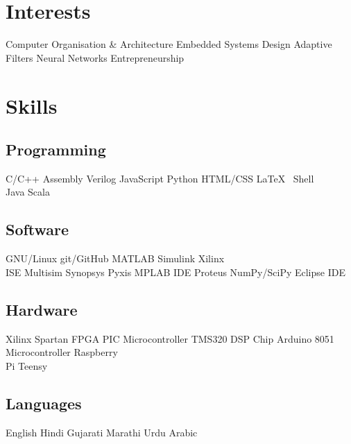 \documentclass[]{deedy}
\begin{document}
\begin{minipage}[t]{0.25\textwidth} 
\begin{flushleft}
%
\section{Interests}
Computer Organisation \& Architecture \textbullet{} Embedded Systems Design \textbullet{} Adaptive Filters \textbullet{} Neural Networks \textbullet{} Entrepreneurship
\sectionsep
%
\section{Skills}
\subsection{Programming}
C/C++ \textbullet{} Assembly \textbullet{} Verilog \textbullet{} JavaScript \textbullet{} Python \textbullet{} HTML/CSS \textbullet{} \LaTeX\ \textbullet{} Shell \textbullet{} \\
Java \textbullet{} Scala
%
\subsection{Software}
GNU/Linux \textbullet{} git/GitHub \textbullet{} MATLAB \textbullet{} Simulink \textbullet{} Xilinx \\
ISE \textbullet{} Multisim \textbullet{} Synopsys \textbullet{} Pyxis \textbullet{} MPLAB IDE \textbullet{} Proteus \textbullet{} NumPy/SciPy \textbullet{} Eclipse IDE
%
\subsection{Hardware}
Xilinx Spartan FPGA \textbullet{} PIC Microcontroller \textbullet{} TMS320 DSP Chip \textbullet{} Arduino \textbullet{} 8051 Microcontroller \textbullet{} Raspberry \\
Pi \textbullet{} Teensy
%
\subsection{Languages}
English \textbullet{} Hindi \textbullet{} Gujarati \textbullet{} Marathi \textbullet{} Urdu \textbullet{} Arabic
\sectionsep
%

\end{flushleft}
\end{minipage}
\end{document}
